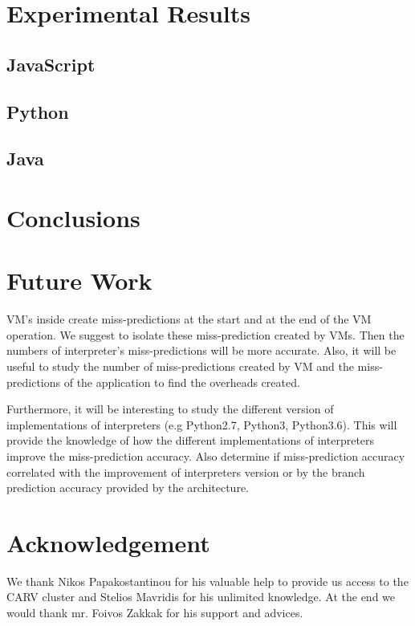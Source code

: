 \documentclass[parskip=full, paper=a4, fontsize=12pt]{scrartcl}
\numberwithin{equation}{section}
\numberwithin{figure}{section}
\numberwithin{table}{section}
\begin{document}
\section{Experimental Results}
\subsection{JavaScript}

\subsection{Python}

\subsection{Java}

\section{Conclusions}



\section{Future Work}
VM's inside create miss-predictions at the start and at the end of the
VM operation.  We suggest to isolate these miss-prediction created by
VMs. Then the numbers of interpreter's miss-predictions will be more
accurate. Also, it will be useful to study the number of
miss-predictions created by VM and the miss-predictions of the
application to find the overheads created.

Furthermore, it will be interesting to study the different version of
implementations of interpreters (e.g Python2.7, Python3, Python3.6).
This will provide the knowledge of how the different implementations
of interpreters improve the miss-prediction accuracy. Also determine
if miss-prediction accuracy correlated with the improvement of
interpreters version or by the branch prediction accuracy provided by
the architecture.

\section{Acknowledgement}
We thank Nikos Papakostantinou for his valuable help to provide us
access to the CARV cluster and Stelios Mavridis for his unlimited
knowledge. At the end we would thank mr. Foivos Zakkak for his support
and advices.

\newpage


\end{document}
